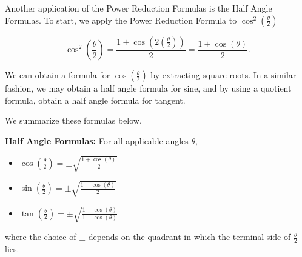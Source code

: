 \documentclass{ximera}
\begin{document}
Another application of the Power Reduction Formulas is the Half Angle Formulas. To start, we apply the Power Reduction Formula to $\cos^{2}\left(\frac{\theta}{2}\right)$

\[ \cos^{2}\left( \frac{\theta}{2}\right) =  \frac{1 + \cos\left(2 \left(\frac{\theta}{2}\right)\right)}{2} =  \frac{1 + \cos(\theta)}{2}.\]

We can obtain a formula for $\cos\left(\frac{\theta}{2}\right)$ by extracting square roots.  In a similar fashion, we may obtain a half angle formula for sine, and by  using a quotient formula, obtain a half angle formula for tangent.  

 

We summarize these formulas below.

 


\begin{theorem} \label{halfangle}  \textbf{Half Angle Formulas:} For all applicable angles $\theta$, 

\begin{itemize}

\item  $\cos\left( \frac{\theta}{2}\right) = \pm \sqrt{ \frac{1 + \cos(\theta)}{2}}$

\item  $\sin\left( \frac{\theta}{2}\right) = \pm \sqrt{ \frac{1 - \cos(\theta)}{2}}$

\item  $\tan\left( \frac{\theta}{2}\right) = \pm \sqrt{ \frac{1 - \cos(\theta)}{1+\cos(\theta)}}$

\end{itemize}

\vspace{-.1in}

where the choice of $\pm$ depends on the quadrant in which the terminal side of $ \frac{\theta}{2}$ lies.

 

\end{theorem}


 
\end{document}
